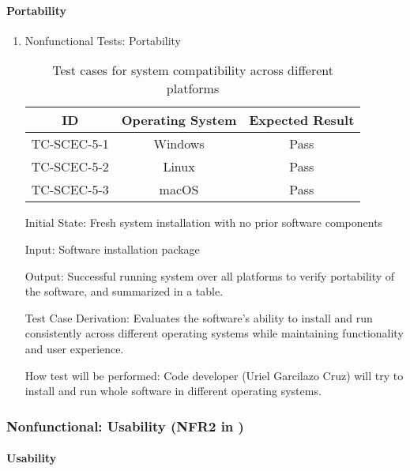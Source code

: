\documentclass[12pt, titlepage]{article}
\begin{document}
\paragraph{Portability}

\begin{enumerate}
  \item{Nonfunctional Tests: Portability}
  \begin{table}[h]
    \centering
    \begin{tabular}{|c|c|c|}
      \hline
      ID & Operating System & Expected Result \\
      \hline
      TC-SCEC-5-1 & Windows & Pass \\
      \hline
      TC-SCEC-5-2 & Linux & Pass \\
      \hline
      TC-SCEC-5-3 & macOS & Pass \\
      \hline
    \end{tabular}
    \caption{Test cases for system compatibility across different platforms}
    \label{tab:test-case-portability}
  \end{table}

Initial State: Fresh system installation with no prior software components

Input: Software installation package

Output: Successful running system over all platforms to verify portability of the software, and 
summarized in a table.

Test Case Derivation: Evaluates the software's ability to install and run consistently across different operating systems while maintaining functionality and user experience.

How test will be performed: Code developer (Uriel Garcilazo Cruz) will try to install and run whole software in different operating systems.
\end{enumerate}
  


\subsubsection{Nonfunctional: Usability (NFR2 in \citet{SRS})}
\paragraph{Usability}
\end{document}
